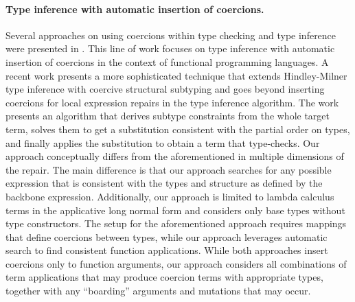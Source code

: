 \paragraph{{\bf Type inference with automatic insertion of coercions.}}
Several approaches on using coercions within type checking and type inference
were presented in \cite{Mitchell:1984:CTI:800017.800529,Luo:2008:CPT:1394781.1394785}.
This line of work focuses on type inference with automatic insertion of coercions in the
context of functional programming languages.
A recent work \cite{Traytel:2011:EHT:2183641.2183654} presents a more sophisticated technique that extends Hindley-Milner
type inference with coercive structural subtyping and goes beyond inserting coercions for
local expression repairs in the type inference algorithm.
The work presents an algorithm that derives subtype constraints from the whole target
term, solves them to get a substitution consistent with the partial order on types, and
finally applies the substitution to obtain a term that type-checks.
Our approach conceptually differs from the aforementioned in multiple dimensions of the
repair.
The main difference is that our approach searches for any possible expression that is
consistent with the types and structure as defined by the backbone expression.
Additionally, our approach is limited to lambda calculus terms in the
applicative long normal form and considers only base types without type
constructors.
The setup for the aforementioned approach requires mappings that define
coercions between types, while our approach leverages automatic search to find
consistent function applications.
While both approaches insert coercions only to function arguments, our approach
considers all combinations of term applications that may produce coercion terms with
appropriate types, together with any ``boarding'' arguments and mutations that may occur.

\vspace{-0.5em}
